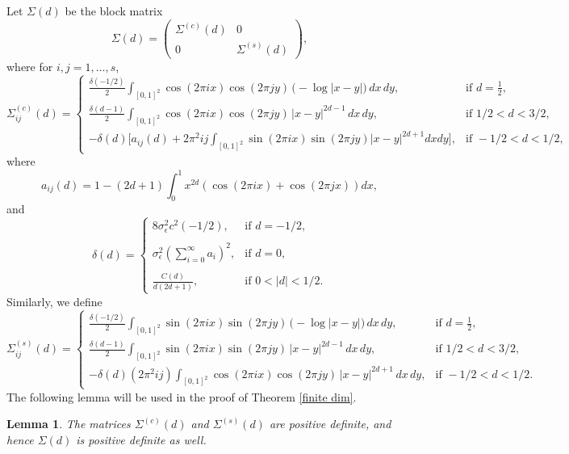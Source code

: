 \documentclass[10pt,a4paper]{amsart}
\numberwithin{equation}{section}
\newtheorem{lem}{Lemma}[section]
\begin{document}
Let
$\Sigma(d)$ be the block matrix
\begin{equation}\label{Sigma}
\Sigma(d) =
\begin{pmatrix}
\Sigma^{(c)}(d) & 0\\[3pt]
0 &\Sigma^{(s)}(d)
\end{pmatrix},
\end{equation}
where for 
 $i,j=1,\ldots,s$, 
\[
\Sigma^{(c)}_{ij}(d) =
\begin{cases}
\displaystyle \frac{\delta(-1/2)}{2}\int_{[0,1]^2}\!\cos(2\pi i x)\cos(2\pi j y)\,
\bigl(-\log|x-y|\bigr)\,dx\,dy,
& \text{if } d=\tfrac{1}{2},\\[10pt]
\displaystyle\frac{\delta(d-1)}{2}\int_{[0,1]^2}\!\cos(2\pi i x)\cos(2\pi j y)\,
|x-y|^{2d-1}\,dx\,dy,
& \text{if } 1/2<d<3/2,\\[10pt]
-\delta(d)\Bigg[a_{ij}(d)+
2\pi^2 i j\displaystyle\int_{[0,1]^2}\sin(2\pi ix)\sin(2\pi jy)\vert x- y\vert^{2d+1}dxdy\Bigg], 
& \text{if } -1/2<d<1/2,
\end{cases}
\]
where
$$
a_{ij}(d)=1-(2d+1)\int_0^1x^{2d}\left(\cos(2\pi ix)+\cos(2\pi jx)\right)dx,
$$
and
\begin{equation}\label{const delta}
\delta(d)=\begin{cases}8\sigma^2_\epsilon c^2(-1/2),&\textrm{if }d=-1/2,\\\\
\sigma^2_\epsilon\left(\displaystyle\sum_{i=0}^\infty a_i\right)^2,&\textrm{if }d=0,\\\\
   \frac{C(d)}{d(2d+1)},&\textrm{if }0<\vert d\vert<1/2.
\end{cases}
\end{equation}
Similarly, we define
\[
\Sigma^{(s)}_{ij}(d) =
\begin{cases}
\displaystyle\frac{\delta(-1/2)}{2} \int_{[0,1]^2}\!\sin(2\pi i x)\sin(2\pi j y)\,
\bigl(-\log|x-y|\bigr)\,dx\,dy,
& \text{if } d=\tfrac{1}{2},\\[10pt]
\frac{\delta(d-1)}{2}\displaystyle\int_{[0,1]^2}\!\sin(2\pi i x)\sin(2\pi j y)\,
|x-y|^{2d-1}\,dx\,dy,
& \text{if } 1/2<d<3/2,\\[10pt]
-\delta(d)(2\pi^2 ij)\displaystyle\int_{[0,1]^2}\!\cos(2\pi i x)\cos(2\pi j y)\,
|x-y|^{2d+1}\,dx\,dy,
& \text{if } -1/2<d<1/2.
\end{cases}
\]
The following lemma will be used in the proof of Theorem \ref{finite dim}.
\begin{lem}\label{invertible}
The matrices $\Sigma^{(c)}(d)$ and $\Sigma^{(s)}(d)$ are positive definite, and hence $\Sigma(d)$ is positive definite as well. 
\end{lem}
\end{document}
